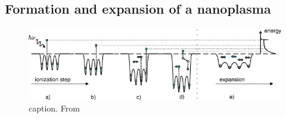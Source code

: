 \subsection{Formation and expansion of a nanoplasma}
\begin{figure}
	\centering
		\includegraphics[width=1.00\textwidth]{images/nano-plasma-schematic.jpg}
	\caption{caption. From \citep[\href{https://creativecommons.org/licenses/by/3.0/}{\ccby}]{Arbeiter-2011-NJP}}
	\label{fig:nano-plasma-schematic}
\end{figure}
